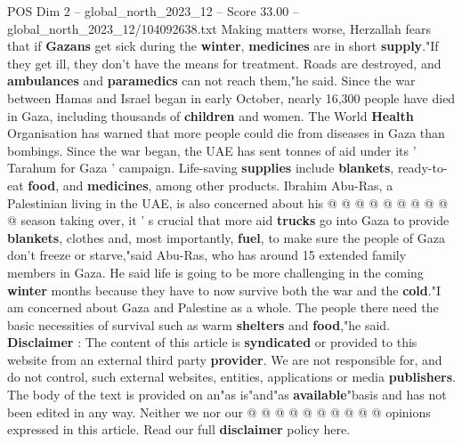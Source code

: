 \begin{textsample}{POS Dim 2 – global\_north\_2023\_12 – Score 33.00 – global\_north\_2023\_12/104092638.txt}
Making matters worse, Herzallah fears that if \textbf{Gazans} get sick during the \textbf{winter}, \textbf{medicines} are in short \textbf{supply}."If they get ill, they don't have the means for treatment.
Roads are destroyed, and \textbf{ambulances} and \textbf{paramedics} can not reach them,"he said.
Since the war between Hamas and Israel began in early October, nearly 16,300 people have died in Gaza, including thousands of \textbf{children} and women.
The World \textbf{Health} Organisation has warned that more people could die from diseases in Gaza than bombings.
Since the war began, the UAE has sent tonnes of aid under its ' Tarahum for Gaza ' campaign.
Life-saving \textbf{supplies} include \textbf{blankets}, ready-to-eat \textbf{food}, and \textbf{medicines}, among other products.
Ibrahim Abu-Ras, a Palestinian living in the UAE, is also concerned about his @ @ @ @ @ @ @ @ @ @ season taking over, it ' s crucial that more aid \textbf{trucks} go into Gaza to provide \textbf{blankets}, clothes and, most importantly, \textbf{fuel}, to make sure the people of Gaza don't freeze or starve,"said Abu-Ras, who has around 15 extended family members in Gaza.
He said life is going to be more challenging in the coming \textbf{winter} months because they have to now survive both the war and the \textbf{cold}."I am concerned about Gaza and Palestine as a whole.
The people there need the basic necessities of survival such as warm \textbf{shelters} and \textbf{food},"he said. \textbf{Disclaimer} : The content of this article is \textbf{syndicated} or provided to this website from an external third party \textbf{provider}.
We are not responsible for, and do not control, such external websites, entities, applications or media \textbf{publishers}.
The body of the text is provided on an"as is"and"as \textbf{available}"basis and has not been edited in any way.
Neither we nor our @ @ @ @ @ @ @ @ @ @ opinions expressed in this article.
Read our full \textbf{disclaimer} policy here.

\end{textsample}
